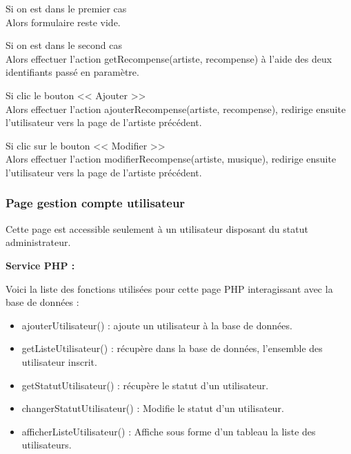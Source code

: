 
			\begin{paragraphe}
				Si on est dans le premier cas \\
				Alors formulaire reste vide.
			\end{paragraphe}

			\begin{paragraphe}
				Si on est dans le second cas \\
				Alors effectuer l'action getRecompense(artiste, recompense) à l'aide des deux identifiants passé en paramètre.
			\end{paragraphe}

			\begin{paragraphe}
				Si clic le bouton << Ajouter >> \\
				Alors effectuer l'action ajouterRecompense(artiste, recompense), redirige ensuite l'utilisateur vers la page de l'artiste précédent.
			\end{paragraphe}

			\begin{paragraphe}
				Si clic sur le bouton << Modifier >> \\
				Alors effectuer l'action modifierRecompense(artiste, musique), redirige ensuite l'utilisateur vers la page de l'artiste précédent.
			\end{paragraphe}

		\subsubsection{Page gestion compte utilisateur}

			\begin{paragraphe}
				Cette page est accessible seulement à un utilisateur disposant du statut administrateur.
			\end{paragraphe}

			\begin{paragraphe}
				\textbf{Service PHP :}
			\end{paragraphe}

			\begin{paragraphe}
				Voici la liste des fonctions utilisées pour cette page PHP interagissant avec la base de données :
				\begin{itemize}
					\item ajouterUtilisateur() : ajoute un utilisateur à la base de données.
					\item getListeUtilisateur() : récupère dans la base de données, l'ensemble des utilisateur inscrit.
					\item getStatutUtilisateur() : récupère le statut d'un utilisateur.
					\item changerStatutUtilisateur() : Modifie le statut d'un utilisateur.
					\item afficherListeUtilisateur() : Affiche sous forme d'un tableau la liste des utilisateurs.
				\end{itemize}
			\end{paragraphe}

